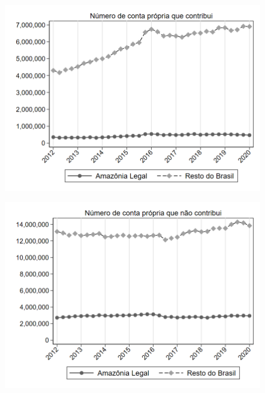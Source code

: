 \begin{frame}[label=_estrutura_emprego_n_cpropriaC]{}
\textit{\hyperlink{_estrutura_emprego}{}}
\begin{figure}
  \centering
  \includegraphics[width=1.0\linewidth]{../../analysis/output/estrutura_emprego/_estrutura_emprego_n_cpropriaC.png}
  \caption{}
  \label{fig:_estrutura_emprego_n_cpropriaC}
\end{figure}
\end{frame}

\begin{frame}[label=_estrutura_emprego_n_cpropriaNc]{}
\textit{\hyperlink{_estrutura_emprego}{}}
\begin{figure}
  \centering
  \includegraphics[width=1.0\linewidth]{../../analysis/output/estrutura_emprego/_estrutura_emprego_n_cpropriaNc.png}
  \caption{}
  \label{fig:_estrutura_emprego_n_cpropriaNc}
\end{figure}
\end{frame}
